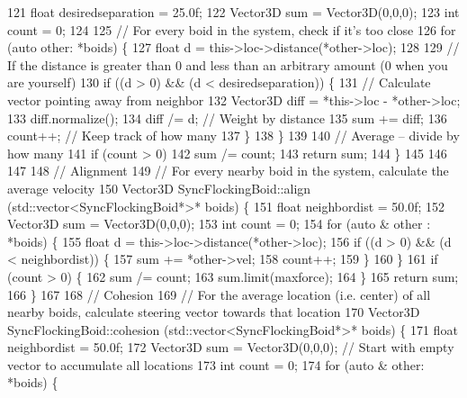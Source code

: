 \begin{DoxyCodeInclude}
121     \textcolor{keywordtype}{float} desiredseparation = 25.0f;
122     Vector3D sum = Vector3D(0,0,0);
123     \textcolor{keywordtype}{int} count = 0;
124     
125     \textcolor{comment}{// For every boid in the system, check if it's too close}
126     \textcolor{keywordflow}{for} (\textcolor{keyword}{auto} other: *boids) \{
127         \textcolor{keywordtype}{float} d = this->loc->distance(*other->loc);
128         
129         \textcolor{comment}{// If the distance is greater than 0 and less than an arbitrary amount (0 when you are yourself)}
130         \textcolor{keywordflow}{if} ((d > 0) && (d < desiredseparation)) \{
131             \textcolor{comment}{// Calculate vector pointing away from neighbor}
132             Vector3D diff = *this->loc - *other->loc;
133             diff.normalize();
134             diff /= d;        \textcolor{comment}{// Weight by distance}
135             sum += diff;
136             count++;            \textcolor{comment}{// Keep track of how many}
137         \}
138     \}
139     
140     \textcolor{comment}{// Average -- divide by how many}
141     \textcolor{keywordflow}{if} (count > 0)
142         sum /= count;
143     \textcolor{keywordflow}{return} sum;
144 \}
145 
146 
147 
148 \textcolor{comment}{// Alignment}
149 \textcolor{comment}{// For every nearby boid in the system, calculate the average velocity}
150 Vector3D SyncFlockingBoid::align (std::vector<SyncFlockingBoid*>* boids) \{
151     \textcolor{keywordtype}{float} neighbordist = 50.0f;
152     Vector3D sum = Vector3D(0,0,0);
153     \textcolor{keywordtype}{int} count = 0;
154     \textcolor{keywordflow}{for} (\textcolor{keyword}{auto} & other : *boids) \{
155         \textcolor{keywordtype}{float} d = this->loc->distance(*other->loc);
156         \textcolor{keywordflow}{if} ((d > 0) && (d < neighbordist)) \{
157             sum += *other->vel;
158             count++;
159         \}
160     \}
161     \textcolor{keywordflow}{if} (count > 0) \{
162         sum /= count;
163         sum.limit(maxforce);
164     \}
165     \textcolor{keywordflow}{return} sum;
166 \}
167 
168 \textcolor{comment}{// Cohesion}
169 \textcolor{comment}{// For the average location (i.e. center) of all nearby boids, calculate steering vector towards that
       location}
170 Vector3D SyncFlockingBoid::cohesion (std::vector<SyncFlockingBoid*>* boids) \{
171     \textcolor{keywordtype}{float} neighbordist = 50.0f;
172     Vector3D sum = Vector3D(0,0,0);   \textcolor{comment}{// Start with empty vector to accumulate all locations}
173     \textcolor{keywordtype}{int} count = 0;
174     \textcolor{keywordflow}{for} (\textcolor{keyword}{auto} & other: *boids) \{

\end{DoxyCodeInclude}

